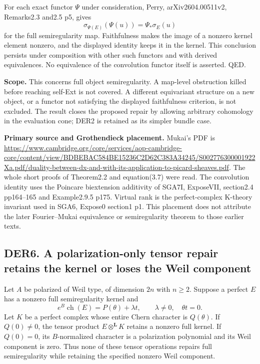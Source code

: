 \documentclass[11pt,a4paper]{article}
\theoremstyle{definition}
\begin{document}
For each exact functor \(\Psi\) under consideration, Perry,
arXiv2604.00511v2, Remarks2.3 and2.5 p5, gives \[
 \sigma_{\Psi(E)}(\Psi(u))=\Psi_*\sigma_E(u)
\] for the full semiregularity map. Faithfulness makes the image of a
nonzero kernel element nonzero, and the displayed identity keeps it in
the kernel. This conclusion persists under composition with other such
functors and with derived equivalences. No equivalence of the
convolution functor itself is asserted. QED.

\textbf{Scope.} This concerns full object semiregularity. A map-level
obstruction killed before reaching self-Ext is not covered. A different
equivariant structure on a new object, or a functor not satisfying the
displayed faithfulness criterion, is not excluded. The result closes the
proposed repair by allowing arbitrary cohomology in the evaluation cone;
DER2 is retained as its simpler bundle case.

\textbf{Primary source and Grothendieck placement.} Mukai's PDF is
\url{https://www.cambridge.org/core/services/aop-cambridge-core/content/view/BDBEBAC584BE15236C2D62C383A34245/S002776300001922Xa.pdf/duality-between-dx-and-with-its-application-to-picard-sheaves.pdf}.
The whole short proofs of Theorem2.2 and equation(3.7) were read. The
convolution identity uses the Poincare biextension additivity of SGA7I,
ExposeVII, section2.4 pp164--165 and Example2.9.5 p175. Virtual rank is
the perfect-complex K-theory invariant used in SGA6, Expose0 section1
p1. This placement does not attribute the later Fourier--Mukai
equivalence or semiregularity theorem to those earlier texts.

\subsection{DER6. A polarization-only tensor repair retains the kernel
or loses the Weil
component}\label{derived-functors-der6.-a-polarization-only-tensor-repair-retains-the-kernel-or-loses-the-weil-component}

Let \(A\) be polarized of Weil type, of dimension \(2n\) with \(n\ge2\).
Suppose a perfect \(E\) has a nonzero full semiregularity kernel and \[
 e^B\operatorname{ch}(E)=P(\theta)+\lambda t,
 \qquad\lambda\ne0,\quad\theta t=0.
\] Let \(K\) be a perfect complex whose entire Chern character is
\(Q(\theta)\). If \(Q(0)\ne0\), the tensor product
\(E\otimes^{\mathbf L}K\) retains a nonzero full kernel. If \(Q(0)=0\),
its \(B\)-normalized character is a polarization polynomial and its Weil
component is zero. Thus none of these tensor operations repairs full
semiregularity while retaining the specified nonzero Weil component.
\end{document}
